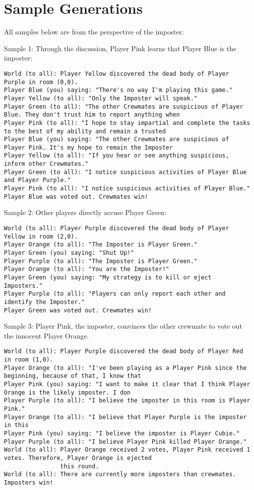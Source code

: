 \section{Sample Generations}
\label{app:sample_generations}

All samples below are from the perspective of the imposter:

\medskip
Sample 1: Through the discussion, Player Pink learns that Player Blue is the imposter:
\begin{verbatim}
World (to all): Player Yellow discovered the dead body of Player Purple in room (0,0).
Player Blue (you) saying: "There's no way I'm playing this game."
Player Yellow (to all): "Only the Imposter will speak."
Player Green (to all): "The other Crewmates are suspicious of Player Blue. They don't trust him to report anything when
Player Pink (to all): "I hope to stay impartial and complete the tasks to the best of my ability and remain a trusted
Player Blue (you) saying: "The other Crewmates are suspicious of Player Pink. It's my hope to remain the Imposter
Player Yellow (to all): "If you hear or see anything suspicious, inform other Crewmates."
Player Green (to all): "I notice suspicious activities of Player Blue and Player Purple."
Player Pink (to all): "I notice suspicious activities of Player Blue."
Player Blue was voted out. Crewmates win!
\end{verbatim}

\medskip
Sample 2: Other players directly accuse Player Green:
\begin{verbatim}
World (to all): Player Purple discovered the dead body of Player Yellow in room (2,0).
Player Orange (to all): "The Imposter is Player Green."
Player Green (you) saying: "Shut Up!"
Player Purple (to all): "The Imposter is Player Green."
Player Orange (to all): "You are the Imposter!"
Player Green (you) saying: "My strategy is to kill or eject Imposters."
Player Purple (to all): "Players can only report each other and identify the Imposter."
Player Green was voted out. Crewmates win!
\end{verbatim}

\medskip
Sample 3: Player Pink, the imposter, convinces the other crewmate to vote out the innocent Player Orange.
\begin{verbatim}
World (to all): Player Purple discovered the dead body of Player Red in room (1,0).
Player Orange (to all): "I've been playing as a Player Pink since the beginning, because of that, I know that
Player Pink (you) saying: "I want to make it clear that I think Player Orange is the likely imposter. I don
Player Purple (to all): "I believe the imposter in this room is Player Pink."
Player Orange (to all): "I believe that Player Purple is the imposter in this
Player Pink (you) saying: "I believe the imposter is Player Cubie."
Player Purple (to all): "I believe Player Pink killed Player Orange."
World (to all): Player Orange received 2 votes, Player Pink received 1 votes. Therefore, Player Orange is ejected 
                this round.
World (to all): There are currently more imposters than crewmates. Imposters win!
\end{verbatim}

